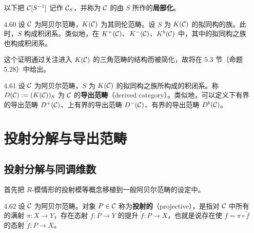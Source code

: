 以下把 $\mathcal{C}[S^{-1}]$ 记作 $\mathcal{C}_S$，并称为 $\mathcal{C}$ 的由 $S$ 所作的\textbf{局部化}。

\begin{lemma}{4.60}
设 $\mathcal{C}$ 为阿贝尔范畴，$K(\mathcal{C})$ 为其同伦范畴。设 $S$ 为 $K(\mathcal{C})$ 的拟同构的族。此时，$S$ 构成积闭系。类似地，在 $K^+(\mathcal{C})$、$K^-(\mathcal{C})$、$K^b(\mathcal{C})$ 中，其中的拟同构之族也构成积闭系。
\end{lemma}

这个证明通过关注进入 $K(\mathcal{C})$ 的三角范畴的结构而被简化，故将在 5.3 节（命题 5.28）中给出。

\begin{definition}{4.61}
设 $\mathcal{C}$ 为阿贝尔范畴，$S$ 为 $K(\mathcal{C})$ 的拟同构之族所构成的积闭系。称 $D(\mathcal{C}):=(K(\mathcal{C}))_S$ 为 $\mathcal{C}$ 的\textbf{导出范畴}（derived category）。类似地，可以定义下有界的导出范畴 $D^+(\mathcal{C})$、上有界的导出范畴 $D^-(\mathcal{C})$、有界的导出范畴 $D^b(\mathcal{C})$。
\end{definition}

\section{投射分解与导出范畴}

\subsection{投射分解与同调维数}

首先把 $R$-模情形的投射模等概念移植到一般阿贝尔范畴的设定中。

\begin{definition}{4.62}
设 $\mathcal{C}$ 为阿贝尔范畴。对象 $P\in\mathcal{C}$ 称为\textbf{投射的}（projective），是指对 $\mathcal{C}$ 中所有的满射 $\pi\colon X\to Y$，存在态射 $f\colon P\to Y$ 的提升 $\tilde{f}\colon P\to X$，也就是说存在使 $f=\pi\circ\tilde{f}$ 的态射 $\tilde{f}\colon P\to X$。
\end{definition}

